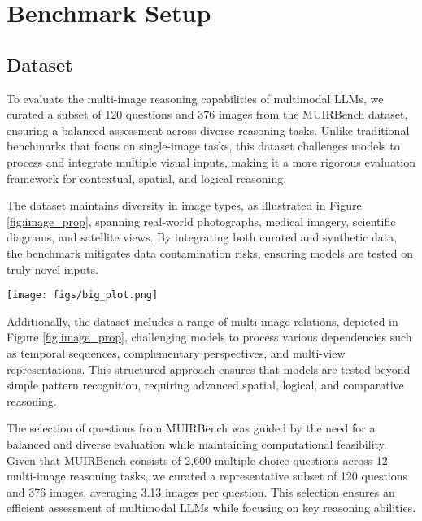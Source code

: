 \section{Benchmark Setup} \label{sec:benchmark_setup}


\subsection{Dataset}
To evaluate the multi-image reasoning capabilities of multimodal LLMs, we curated a subset of 120 questions and 376 images from the MUIRBench \cite{wang2024muirbench} dataset, ensuring a balanced assessment across diverse reasoning tasks. Unlike traditional benchmarks that focus on single-image tasks, this dataset challenges models to process and integrate multiple visual inputs, making it a more rigorous evaluation framework for contextual, spatial, and logical reasoning.


The dataset maintains diversity in image types, as illustrated in Figure \ref{fig:image_prop}, spanning real-world photographs, medical imagery, scientific diagrams, and satellite views. By integrating both curated and synthetic data, the benchmark mitigates data contamination risks, ensuring models are tested on truly novel inputs.

\begin{figure*}
    \centering
    \texttt{[image: figs/big\_plot.png]}
    \caption{The distribution of the questions based on the type of images, image relations, and tasks.}
    \vspace{-1em}
    \label{fig:image_prop}
\end{figure*} 
Additionally, the dataset includes a range of multi-image relations, depicted in Figure \ref{fig:image_prop}, challenging models to process various dependencies such as temporal sequences, complementary perspectives, and multi-view representations. This structured approach ensures that models are tested beyond simple pattern recognition, requiring advanced spatial, logical, and comparative reasoning. 


The selection of questions from MUIRBench was guided by the need for a balanced and diverse evaluation while maintaining computational feasibility. Given that MUIRBench consists of 2,600 multiple-choice questions across 12 multi-image reasoning tasks, we curated a representative subset of 120 questions and 376 images, averaging 3.13 images per question. This selection ensures an efficient assessment of multimodal LLMs while focusing on key reasoning abilities.

